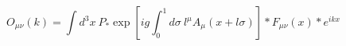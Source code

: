 \begin{equation}
  O_{\mu \nu}(k) = \int d^3 x~ P_* \exp \left[ ig \int_0^1 d \sigma~
    l^\mu A_\mu (x + l \sigma) \right]
    \ast F_{\mu \nu} (x) \ast e^{ikx}
\label{O-definition}
\end{equation}

